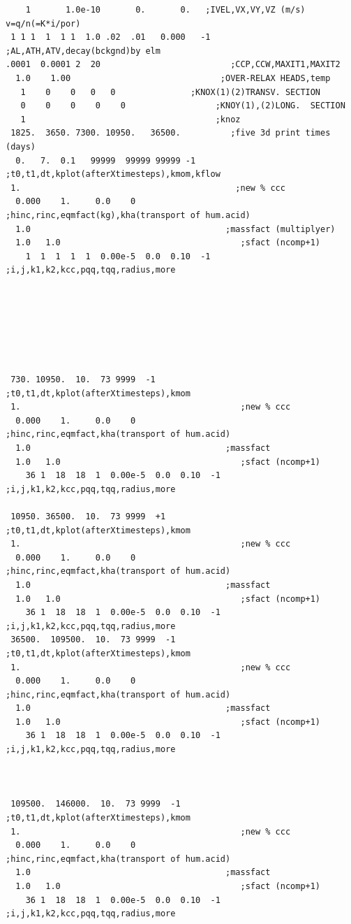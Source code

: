 \documentclass[12pt,twoside]{report}
\begin{document}
\begin{verbatim}
    1       1.0e-10       0.       0.   ;IVEL,VX,VY,VZ (m/s) v=q/n(=K*i/por)
 1 1 1  1  1 1  1.0 .02  .01   0.000   -1    ;AL,ATH,ATV,decay(bckgnd)by elm
.0001  0.0001 2  20                          ;CCP,CCW,MAXIT1,MAXIT2
  1.0    1.00                              ;OVER-RELAX HEADS,temp
   1    0    0   0   0               ;KNOX(1)(2)TRANSV. SECTION
   0    0    0    0    0                  ;KNOY(1),(2)LONG.  SECTION
   1                                      ;knoz
 1825.  3650. 7300. 10950.   36500.          ;five 3d print times (days)
  0.   7.  0.1   99999  99999 99999 -1             ;t0,t1,dt,kplot(afterXtimesteps),kmom,kflow
 1.                                           ;new % ccc
  0.000    1.     0.0    0                  ;hinc,rinc,eqmfact(kg),kha(transport of hum.acid)
  1.0                                       ;massfact (multiplyer)
  1.0   1.0                                    ;sfact (ncomp+1)
    1  1  1  1  1  0.00e-5  0.0  0.10  -1         ;i,j,k1,k2,kcc,pqq,tqq,radius,more







 730. 10950.  10.  73 9999  -1             ;t0,t1,dt,kplot(afterXtimesteps),kmom
 1.                                            ;new % ccc
  0.000    1.     0.0    0                  ;hinc,rinc,eqmfact,kha(transport of hum.acid)
  1.0                                       ;massfact
  1.0   1.0                                    ;sfact (ncomp+1)
    36 1  18  18  1  0.00e-5  0.0  0.10  -1         ;i,j,k1,k2,kcc,pqq,tqq,radius,more

 10950. 36500.  10.  73 9999  +1           ;t0,t1,dt,kplot(afterXtimesteps),kmom
 1.                                            ;new % ccc
  0.000    1.     0.0    0                  ;hinc,rinc,eqmfact,kha(transport of hum.acid)
  1.0                                       ;massfact
  1.0   1.0                                    ;sfact (ncomp+1)
    36 1  18  18  1  0.00e-5  0.0  0.10  -1         ;i,j,k1,k2,kcc,pqq,tqq,radius,more
 36500.  109500.  10.  73 9999  -1         ;t0,t1,dt,kplot(afterXtimesteps),kmom
 1.                                            ;new % ccc
  0.000    1.     0.0    0                  ;hinc,rinc,eqmfact,kha(transport of hum.acid)
  1.0                                       ;massfact
  1.0   1.0                                    ;sfact (ncomp+1)
    36 1  18  18  1  0.00e-5  0.0  0.10  -1         ;i,j,k1,k2,kcc,pqq,tqq,radius,more



 109500.  146000.  10.  73 9999  -1         ;t0,t1,dt,kplot(afterXtimesteps),kmom
 1.                                            ;new % ccc
  0.000    1.     0.0    0                  ;hinc,rinc,eqmfact,kha(transport of hum.acid)
  1.0                                       ;massfact
  1.0   1.0                                    ;sfact (ncomp+1)
    36 1  18  18  1  0.00e-5  0.0  0.10  -1         ;i,j,k1,k2,kcc,pqq,tqq,radius,more

\end{verbatim}





\end{document}
